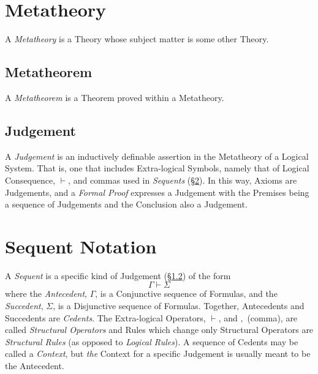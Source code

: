 \section{Metatheory} \label{sec:metatheory}

A \emph{Metatheory} is a Theory whose subject matter is some other
Theory.



\subsection{Metatheorem}\label{sec:metatheorem}

A \emph{Metatheorem} is a Theorem proved within a Metatheory.



\subsection{Judgement}\label{sec:judgement}

A \emph{Judgement} is an inductively definable assertion in the
Metatheory of a Logical System. That is, one that includes
Extra-logical Symbols, namely that of Logical Consequence, $\vdash$,
and commas used in \emph{Sequents}
(\S\ref{sec:sequent_notation}). In this way, Axioms are Judgements,
and a \emph{Formal Proof} expresses a Judgement with the Premises
being a sequence of Judgements and the Conclusion also a Judgement.



\section{Sequent Notation}\label{sec:sequent_notation}

A \emph{Sequent} is a specific kind of Judgement
(\S\ref{sec:judgement}) of the form
\[
    \Gamma \vdash \Sigma
\]
where the \emph{Antecedent}, $\Gamma$, is a Conjunctive sequence of
Formulas, and the \emph{Succedent}, $\Sigma$, is a Disjunctive
sequence of Formulas. Together, Antecedents and Succedents are
\emph{Cedents}. The Extra-logical Operators, $\vdash$, and $,$
(comma), are called \emph{Structural Operators} and Rules which change
only Structural Operators are \emph{Structural Rules} (as opposed to
\emph{Logical Rules}). A sequence of Cedents may be called a
\emph{Context}, but \emph{the} Context for a specific Judgement is
usually meant to be the Antecedent.

